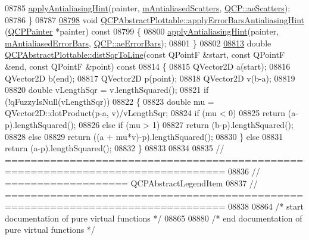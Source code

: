 \begin{DoxyCode}
08785   \hyperlink{a00044_a62bd552d1a45aa9accb24b310542279e}{applyAntialiasingHint}(painter, \hyperlink{a00024_aa115755e525a8e3a86dc683f9cab755b}{mAntialiasedScatters}, 
      \hyperlink{a00143_ae55dbe315d41fe80f29ba88100843a0cae45ed8cd167bffe27d7f40da4bc17e9c}{QCP::aeScatters});
08786 \}
08787 
\hypertarget{a00115_source_l08798}{}\hyperlink{a00024_af687bfe6160255960558eb71f1f81e73}{08798} \textcolor{keywordtype}{void} \hyperlink{a00024_af687bfe6160255960558eb71f1f81e73}{QCPAbstractPlottable::applyErrorBarsAntialiasingHint}
      (\hyperlink{a00047}{QCPPainter} *painter)\textcolor{keyword}{ const}
08799 \textcolor{keyword}{}\{
08800   \hyperlink{a00044_a62bd552d1a45aa9accb24b310542279e}{applyAntialiasingHint}(painter, \hyperlink{a00024_ad48660b2bd301576e92fb033d8f455ea}{mAntialiasedErrorBars}, 
      \hyperlink{a00143_ae55dbe315d41fe80f29ba88100843a0ca9dcf3882cb321bb305f71fdc0f09f63d}{QCP::aeErrorBars});
08801 \}
08802 
\hypertarget{a00115_source_l08813}{}\hyperlink{a00024_a5ea1cab44ca912dcdc96ed81ec5bed5d}{08813} \textcolor{keywordtype}{double} \hyperlink{a00024_a5ea1cab44ca912dcdc96ed81ec5bed5d}{QCPAbstractPlottable::distSqrToLine}(\textcolor{keyword}{const} QPointF &start, \textcolor{keyword}{const} 
      QPointF &end, \textcolor{keyword}{const} QPointF &point)\textcolor{keyword}{ const}
08814 \textcolor{keyword}{}\{
08815   QVector2D a(start);
08816   QVector2D b(end);
08817   QVector2D p(point);
08818   QVector2D v(b-a);
08819   
08820   \textcolor{keywordtype}{double} vLengthSqr = v.lengthSquared();
08821   \textcolor{keywordflow}{if} (!qFuzzyIsNull(vLengthSqr))
08822   \{
08823     \textcolor{keywordtype}{double} mu = QVector2D::dotProduct(p-a, v)/vLengthSqr;
08824     \textcolor{keywordflow}{if} (mu < 0)
08825       \textcolor{keywordflow}{return} (a-p).lengthSquared();
08826     \textcolor{keywordflow}{else} \textcolor{keywordflow}{if} (mu > 1)
08827       \textcolor{keywordflow}{return} (b-p).lengthSquared();
08828     \textcolor{keywordflow}{else}
08829       \textcolor{keywordflow}{return} ((a + mu*v)-p).lengthSquared();
08830   \} \textcolor{keywordflow}{else}
08831     \textcolor{keywordflow}{return} (a-p).lengthSquared();
08832 \}
08833 
08834 
08835 \textcolor{comment}{// ================================================================================}
08836 \textcolor{comment}{// =================== QCPAbstractLegendItem}
08837 \textcolor{comment}{// ================================================================================}
08838 
08864 \textcolor{comment}{/* start documentation of pure virtual functions */}
08865 
08880 \textcolor{comment}{/* end documentation of pure virtual functions */}

\end{DoxyCode}
